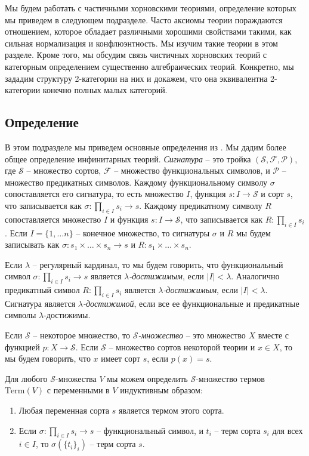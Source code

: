 \documentclass[reqno]{amsart}
\theoremstyle{definition}
\theoremstyle{remark}
\newcommand{\Term}{\mathrm{Term}}
\begin{document}
Мы будем работать с частичными хорновскими теориями, определение которых мы приведем в следующем подразделе.
Часто аксиомы теории пораждаются отношением, которое обладает различными хорошими свойствами такими, как сильная нормализация и конфлюэнтность.
Мы изучим такие теории в этом разделе.
Кроме того, мы обсудим связь чистичных хорновских теорий с категорным определением существенно алгебраических теорий.
Конкретно, мы зададим структуру 2-категории на них и докажем, что она эквивалентна 2-категории конечно полных малых категорий.

\subsection{Определение}

В этом подразделе мы приведем основные определения из \cite{PHL}.
Мы дадим более общее определение инфинитарных теорий.
\emph{Сигнатура} -- это тройка $(\mathcal{S},\mathcal{F},\mathcal{P})$, где $\mathcal{S}$ -- множество сортов, $\mathcal{F}$ -- множество функциональных символов, и $\mathcal{P}$ -- множество предикатных символов.
Каждому функциональному символу $\sigma$ сопоставляется его сигнатура, то есть множество $I$, функция $s : I \to \mathcal{S}$ и сорт $s$, что записывается как $\sigma : \prod_{i \in I} s_i \to s$.
Каждому предикатному символу $R$ сопоставляется множество $I$ и функция $s : I \to \mathcal{S}$, что записывается как $R : \prod_{i \in I} s_i$.
Если $I = \{ 1, \ldots n \}$ -- конечное множество, то сигнатуры $\sigma$ и $R$ мы будем записывать как $\sigma : s_1 \times \ldots \times s_n \to s$ и $R : s_1 \times \ldots \times s_n$.

Если $\lambda$ -- регулярный кардинал, то мы будем говорить, что функциональный символ $\sigma : \prod_{i \in I} s_i \to s$ является \emph{$\lambda$-достижимым}, если $|I| < \lambda$.
Аналогично предикатный символ $R : \prod_{i \in I} s_i$ является \emph{$\lambda$-достижимым}, если $|I| < \lambda$.
Сигнатура является \emph{$\lambda$-достижимой}, если все ее функциональные и предикатные символы $\lambda$-достижимы.

\begin{defn}
Если $\mathcal{S}$ -- некоторое множество, то \emph{$\mathcal{S}$-множество} -- это множество $X$ вместе с функцией $p : X \to \mathcal{S}$.
Если $\mathcal{S}$ -- множество сортов некоторой теории и $x \in X$, то мы будем говорить, что $x$ имеет сорт $s$, если $p(x) = s$.
\end{defn}

Для любого $\mathcal{S}$-множества $V$ мы можем определить $\mathcal{S}$-множество термов $\Term(V)$ с переменными в $V$ индуктивным образом:
\begin{enumerate}
\item Любая переменная сорта $s$ является термом этого сорта.
\item Если $\sigma : \prod_{i \in I} s_i \to s$ -- функциональный символ, и $t_i$ -- терм сорта $s_i$ для всех $i \in I$, то $\sigma(\{ t_i \}_i)$ -- терм сорта $s$.
\end{enumerate}
\end{document}
